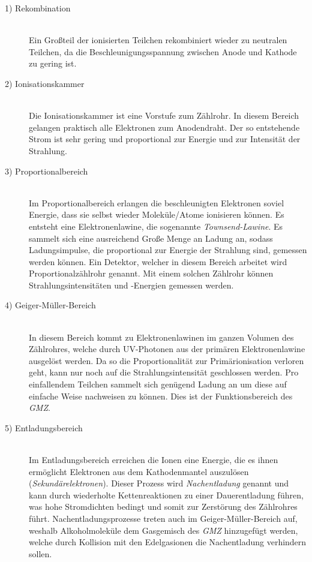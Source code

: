 \begin{description}
  \item[1) Rekombination]\hfill \\
    Ein Großteil der ionisierten Teilchen rekombiniert wieder zu neutralen Teilchen, da die Beschleunigungsspannung zwischen Anode und Kathode zu gering ist.
  \item[2) Ionisationskammer]\hfill \\
    Die Ionisationskammer ist eine Vorstufe zum Zählrohr. In diesem Bereich gelangen praktisch alle Elektronen zum Anodendraht. Der so entstehende Strom ist 
    sehr gering und proportional zur Energie und zur Intensität der Strahlung.
  \item[3) Proportionalbereich]\hfill \\
    Im Proportionalbereich erlangen die beschleunigten Elektronen soviel Energie, dass sie selbst wieder Moleküle/Atome ionisieren können. Es entsteht eine
    Elektronenlawine, die sogenannte \textit{Townsend-Lawine}. Es sammelt sich eine ausreichend Große Menge an Ladung an, sodass Ladungsimpulse, die proportional
    zur Energie der Strahlung sind, gemessen werden können. Ein Detektor, welcher in diesem Bereich arbeitet wird Proportionalzählrohr genannt. Mit einem solchen
    Zählrohr können Strahlungsintensitäten und -Energien gemessen werden.
  \item[4) Geiger-Müller-Bereich]\hfill \\   
    In diesem Bereich kommt zu Elektronenlawinen im ganzen Volumen des Zählrohres, welche durch UV-Photonen aus der primären Elektronenlawine ausgelöst werden. 
    Da so die Proportionalität zur Primärionisation verloren geht, kann nur noch auf die Strahlungsintensität geschlossen werden. Pro einfallendem Teilchen sammelt 
    sich genügend Ladung an um diese auf einfache Weise nachweisen zu können. Dies ist der Funktionsbereich des \textit{GMZ}.
  \item[5) Entladungsbereich]\hfill \\
    Im Entladungsbereich erreichen die Ionen eine Energie, die es ihnen ermöglicht Elektronen aus dem Kathodenmantel auszulösen (\textit{Sekundärelektronen}). 
    Dieser Prozess wird \textit{Nachentladung} genannt und kann durch wiederholte Kettenreaktionen zu einer Dauerentladung führen, was hohe Stromdichten bedingt 
    und somit zur Zerstörung des Zählrohres führt. Nachentladungsprozesse treten auch im Geiger-Müller-Bereich auf, weshalb Alkoholmoleküle dem Gasgemisch 
    des \textit{GMZ} hinzugefügt werden, welche durch Kollision mit den Edelgasionen die Nachentladung verhindern sollen.
\end{description}

